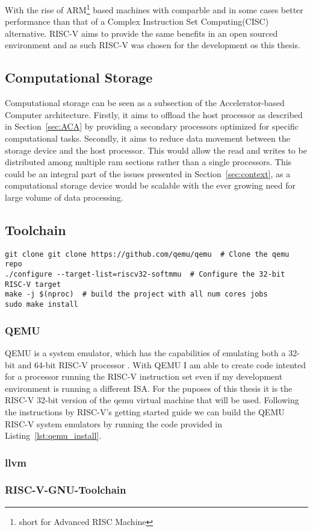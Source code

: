 With the rise of ARM\footnote{short for Advanced RISC Machine} based machines
with comparble and in some cases better performance than that of a Complex
Instruction Set Computing(CISC) alternative.\cite{Power_Struggle} RISC-V aims to
provide the same benefits in an open sourced environment and as such RISC-V was
chosen for the development os this thesis.

\subsection{Computational Storage}
Computational storage can be seen as a subsection of the Accelerator-based
Computer architecture. Firstly, it aims to offload the host processor as
described in Section~\ref{sec:ACA} by providing a secondary processors optimized
for specific computational tasks. Secondly, it aims to reduce data movement
between the storage device and the host processor. This would allow the read and
writes to be distributed among multiple ram sections rather than a single
processors. This could be an integral part of the issues presented in
Section~\ref{sec:context}, as a computational storage device would be scalable
with the ever growing need for large volume of data processing.


\subsection{Toolchain}
\begin{lstlisting}[caption=Installing QEMU, float=*, label=lst:qemu_install]
git clone git clone https://github.com/qemu/qemu  # Clone the qemu repo
./configure --target-list=riscv32-softmmu  # Configure the 32-bit RISC-V target
make -j $(nproc)  # build the project with all num cores jobs
sudo make install
\end{lstlisting}
\subsubsection{QEMU}
QEMU is a system emulator, which has the capabilities of emulating both a 32-bit
and 64-bit RISC-V processor \cite{QEMU}. With QEMU I am able to create code intented
for a processor running the RISC-V instruction set even if my development
environment is running a different ISA. For the puposes of this thesis it is the
RISC-V 32-bit version of the qemu virtual machine that will be used.
Following the instructions by RISC-V's getting started guide
we can build the QEMU RISC-V system emulators by running the code
provided in Listing~\ref{lst:qemu_install}\cite{RISC-V_GS}.

\subsubsection{llvm}


\subsubsection{RISC-V-GNU-Toolchain}


